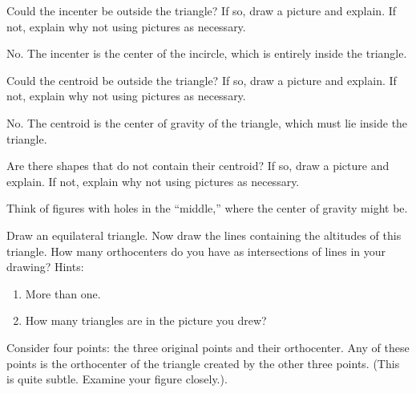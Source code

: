 \documentclass[nooutcomes]{ximera}
\begin{document}
\begin{problem}
Could the incenter be outside the triangle? If so, draw a
  picture and explain. If not, explain why not using pictures as
  necessary.
\begin{freeResponse}
\begin{hint}
No.  The incenter is the center of the incircle, which is entirely inside the triangle.  
\end{hint}
\end{freeResponse}
\end{problem}

\begin{problem}
Could the centroid be outside the triangle? If so, draw a
  picture and explain. If not, explain why not using pictures as
  necessary.
\begin{freeResponse}
\begin{hint}
No. The centroid is the center of gravity of the triangle, which must lie inside the triangle.  
\end{hint}
\end{freeResponse}
\end{problem}

\begin{problem}
Are there shapes that do not contain their centroid? If so, draw
  a picture and explain. If not, explain why not using pictures as
  necessary.
\begin{freeResponse}
\begin{hint}
Think of figures with holes in the ``middle,'' where the center of gravity might be.  
\end{hint}
\end{freeResponse}
\end{problem}

\begin{problem}
Draw an equilateral triangle. Now draw the lines containing the
  altitudes of this triangle. How many orthocenters do you have as
  intersections of lines in your drawing? Hints:
\begin{enumerate}
\item More than one.
\item How many triangles are in the picture you drew?
\end{enumerate}
\begin{freeResponse}
\begin{hint}
Consider four points: the three original points and their orthocenter.  Any of these points is the orthocenter of the triangle created by the other three points.  (This is quite subtle.  Examine your figure closely.). 
\end{hint}
\end{freeResponse}
\end{problem}
\end{document}
